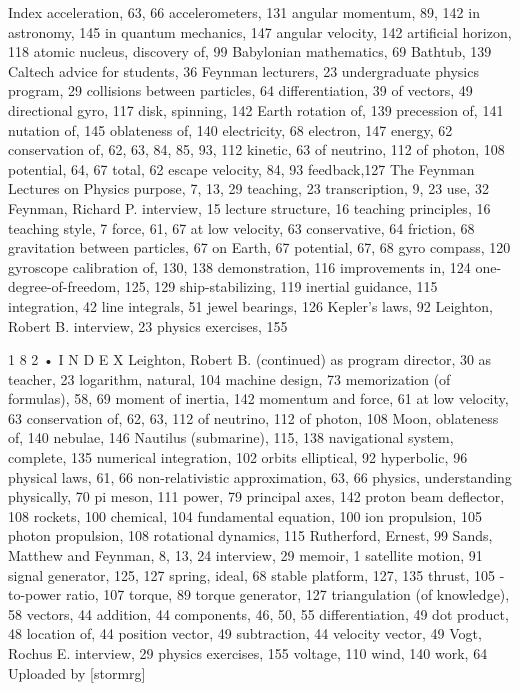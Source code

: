 \documentclass[11pt,oneside]{article}
\begin{document}
Index acceleration, 63, 66 accelerometers, 131 angular momentum, 89, 142 in astronomy, 145 in quantum mechanics, 147 angular velocity, 142 artificial horizon, 118 atomic nucleus, discovery of, 99 Babylonian mathematics, 69 Bathtub, 139 Caltech advice for students, 36 Feynman lecturers, 23 undergraduate physics program, 29 collisions between particles, 64 differentiation, 39 of vectors, 49 directional gyro, 117 disk, spinning, 142 Earth rotation of, 139 precession of, 141 nutation of, 145 oblateness of, 140 electricity, 68 electron, 147 energy, 62 conservation of, 62, 63, 84, 85, 93, 112 kinetic, 63 of neutrino, 112 of photon, 108 potential, 64, 67 total, 62 escape velocity, 84, 93 feedback,127 The Feynman Lectures on Physics purpose, 7, 13, 29 teaching, 23 transcription, 9, 23 use, 32 Feynman, Richard P. interview, 15 lecture structure, 16 teaching principles, 16 teaching style, 7 force, 61, 67 at low velocity, 63 conservative, 64 friction, 68 gravitation between particles, 67 on Earth, 67 potential, 67, 68 gyro compass, 120 gyroscope calibration of, 130, 138 demonstration, 116 improvements in, 124 one-degree-of-freedom, 125, 129 ship-stabilizing, 119 inertial guidance, 115 integration, 42 line integrals, 51 jewel bearings, 126 Kepler’s laws, 92 Leighton, Robert B. interview, 23 physics exercises, 155\par



1 8 2 • I N D E X Leighton, Robert B. (continued) as program director, 30 as teacher, 23 logarithm, natural, 104 machine design, 73 memorization (of formulas), 58, 69 moment of inertia, 142 momentum and force, 61 at low velocity, 63 conservation of, 62, 63, 112 of neutrino, 112 of photon, 108 Moon, oblateness of, 140 nebulae, 146 Nautilus (submarine), 115, 138 navigational system, complete, 135 numerical integration, 102 orbits elliptical, 92 hyperbolic, 96 physical laws, 61, 66 non-relativistic approximation, 63, 66 physics, understanding physically, 70 pi meson, 111 power, 79 principal axes, 142 proton beam deflector, 108 rockets, 100 chemical, 104 fundamental equation, 100 ion propulsion, 105 photon propulsion, 108 rotational dynamics, 115 Rutherford, Ernest, 99 Sands, Matthew and Feynman, 8, 13, 24 interview, 29 memoir, 1 satellite motion, 91 signal generator, 125, 127 spring, ideal, 68 stable platform, 127, 135 thrust, 105 -to-power ratio, 107 torque, 89 torque generator, 127 triangulation (of knowledge), 58 vectors, 44 addition, 44 components, 46, 50, 55 differentiation, 49 dot product, 48 location of, 44 position vector, 49 subtraction, 44 velocity vector, 49 Vogt, Rochus E. interview, 29 physics exercises, 155 voltage, 110 wind, 140 work, 64 Uploaded by [stormrg]\par
\end{document}
